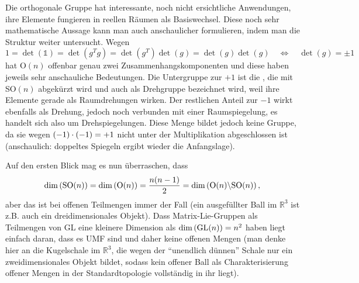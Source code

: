 \documentclass[../H_Analysis_main.tex]{subfiles}
\begin{document}
\begin{bsp}
Die orthogonale Gruppe hat interessante, noch nicht ersichtliche Anwendungen, ihre Elemente fungieren in reellen Räumen als Basiswechsel. Diese noch sehr mathematische Aussage kann man auch anschaulicher formulieren, indem man die Struktur weiter untersucht. Wegen
\begin{equation*}
1 = \det(\mathds{1}) = \det(g^T g) = \det(g^T) \det(g) = \det(g) \det(g) \quad \Leftrightarrow \quad \det(g) = \pm 1
\end{equation*}
hat O$(n)$ offenbar genau zwei Zusammenhangskomponenten und diese haben jeweils sehr anschauliche Bedeutungen. Die Untergruppe zur $+ 1$ ist die , die mit SO$(n)$ abgekürzt wird und auch als Drehgruppe bezeichnet wird, weil ihre Elemente gerade als Raumdrehungen wirken. Der restlichen Anteil zur $- 1$ wirkt ebenfalls als Drehung, jedoch noch verbunden mit einer Raumspiegelung, es handelt sich also um Drehspiegelungen. Diese Menge bildet jedoch keine Gruppe, da sie wegen $\qty(- 1) \cdot \qty(- 1) = + 1$ nicht unter der Multiplikation abgeschlossen ist (anschaulich: doppeltes Spiegeln ergibt wieder die Anfangslage).

Auf den ersten Blick mag es nun überraschen, dass
\begin{equation}
\dim\qty(\text{SO}(n)) = \dim\qty(\text{O}(n)) = \frac{n (n - 1)}{2} = \dim\qty(\text{O}(n)\backslash \text{SO}(n)) \, ,
\end{equation}
aber das ist bei offenen Teilmengen immer der Fall (ein ausgefüllter Ball im $\mathbb{R}^3$ ist z.B. auch ein dreidimensionales Objekt). Dass Matrix-Lie-Gruppen als Teilmengen von GL eine kleinere Dimension als $\dim\qty(\text{GL}(n)) = n^2$ haben liegt einfach daran, dass es UMF sind und daher keine offenen Mengen (man denke hier an die Kugelschale im $\mathbb{R}^3$, die wegen der \enquote{unendlich dünnen} Schale nur ein zweidimensionales Objekt bildet, sodass kein offener Ball als Charakterisierung offener Mengen in der Standardtopologie vollständig in ihr liegt).
\end{bsp}



\newpage
\end{document}
